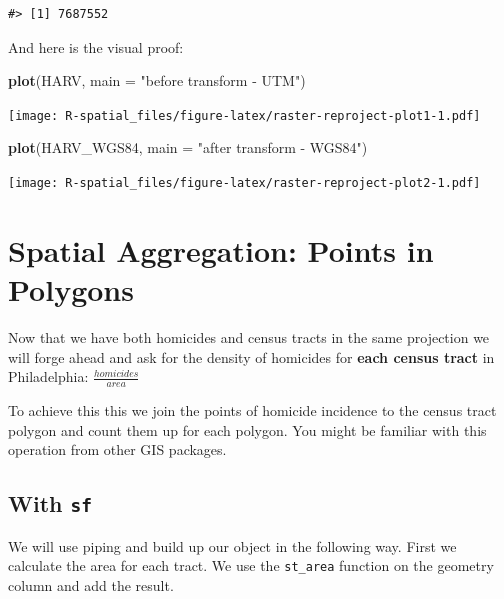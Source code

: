 \documentclass[]{book}
\newenvironment{Shaded}{\begin{snugshade}}{\end{snugshade}}
\newcommand{\KeywordTok}[1]{\textcolor[rgb]{0.13,0.29,0.53}{\textbf{#1}}}
\newcommand{\DataTypeTok}[1]{\textcolor[rgb]{0.13,0.29,0.53}{#1}}
\newcommand{\StringTok}[1]{\textcolor[rgb]{0.31,0.60,0.02}{#1}}
\newcommand{\OperatorTok}[1]{\textcolor[rgb]{0.81,0.36,0.00}{\textbf{#1}}}
\newcommand{\NormalTok}[1]{#1}
\begin{document}
\begin{verbatim}
#> [1] 7687552
\end{verbatim}

And here is the visual proof:

\begin{Shaded}
\begin{Highlighting}[]
\KeywordTok{plot}\NormalTok{(HARV, }\DataTypeTok{main =} \StringTok{"before transform - UTM"}\NormalTok{)}
\end{Highlighting}
\end{Shaded}

\texttt{[image: R-spatial\_files/figure-latex/raster-reproject-plot1-1.pdf]}

\begin{Shaded}
\begin{Highlighting}[]
\KeywordTok{plot}\NormalTok{(HARV_WGS84, }\DataTypeTok{main =} \StringTok{"after transform - WGS84"}\NormalTok{)}
\end{Highlighting}
\end{Shaded}

\texttt{[image: R-spatial\_files/figure-latex/raster-reproject-plot2-1.pdf]}

\section{Spatial Aggregation: Points in
Polygons}\label{spatial-aggregation-points-in-polygons}

Now that we have both homicides and census tracts in the same projection
we will forge ahead and ask for the density of homicides for
\textbf{each census tract} in Philadelphia: \(\frac{{homicides}}{area}\)

To achieve this this we join the points of homicide incidence to the
census tract polygon and count them up for each polygon. You might be
familiar with this operation from other GIS packages.

\subsection{\texorpdfstring{With \texttt{sf}}{With sf}}\label{with-sf-1}

We will use piping and build up our object in the following way. First
we calculate the area for each tract. We use the \texttt{st\_area}
function on the geometry column and add the result.

\begin{Shaded}
\end{Shaded}
\end{document}
